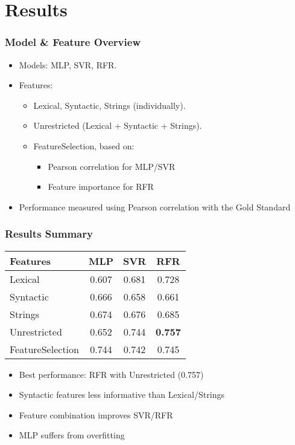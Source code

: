\section{Results}
\frame{\tableofcontents[currentsection]}

\begin{frame}
    \frametitle{Model \& Feature Overview}
    \begin{itemize}
      \item Models: MLP, SVR, RFR.
      \item Features: 
      \begin{itemize}
        \item Lexical, Syntactic, Strings (individually).
        \item Unrestricted (Lexical + Syntactic + Strings).
        \item FeatureSelection, based on:
        \begin{itemize}
            \item Pearson correlation for MLP/SVR
            \item Feature importance for RFR
        \end{itemize}
      \end{itemize}
      \item Performance measured using Pearson correlation with the Gold Standard
    \end{itemize}
\end{frame}
    

\begin{frame}
    \frametitle{Results Summary}
    \begin{table}[ht]
        \centering
        \begin{tabular}{|l|c|c|c|}
            \hline
            \textbf{Features} & \textbf{MLP} & \textbf{SVR} & \textbf{RFR} \\
            \hline
            Lexical            & 0.607       & 0.681       & 0.728 \\
            Syntactic          & 0.666       & 0.658       & 0.661 \\
            Strings            & 0.674       & 0.676       & 0.685 \\
            Unrestricted       & 0.652       & 0.744       & \textbf{0.757} \\
            FeatureSelection   & 0.744       & 0.742       & 0.745 \\
            \hline
        \end{tabular}
    \end{table}
    \begin{itemize}
      \item Best performance: RFR with Unrestricted (0.757)
      \item Syntactic features less informative than Lexical/Strings
      \item Feature combination improves SVR/RFR
      \item MLP suffers from overfitting
    \end{itemize}
\end{frame}
    

